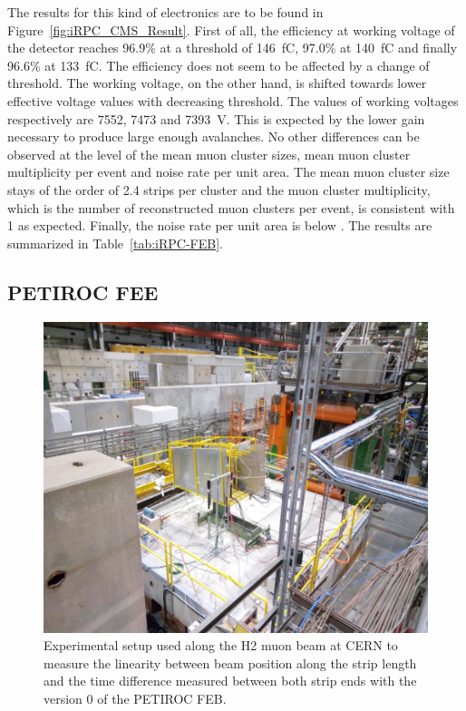     The results for this kind of electronics are to be found in Figure~\ref{fig:iRPC_CMS_Result}. First of all, the efficiency at working voltage of the detector reaches 96.9\% at a threshold of \SI{146}{fC}, 97.0\% at \SI{140}{fC} and finally 96.6\% at \SI{133}{fC}. The efficiency does not seem to be affected by a change of threshold. The working voltage, on the other hand, is shifted towards lower effective voltage values with decreasing threshold. The values of working voltages respectively are 7552, 7473 and \SI{7393}{V}. This is expected by the lower gain necessary to produce large enough avalanches. No other differences can be observed at the level of the mean muon cluster sizes, mean muon cluster multiplicity per event and noise rate per unit area. The mean muon cluster size stays of the order of 2.4 strips per cluster and the muon cluster multiplicity, which is the number of reconstructed muon clusters per event, is consistent with 1 as expected. Finally, the noise rate per unit area is below . The results are summarized in Table~\ref{tab:iRPC-FEB}.
	
		\subsection{PETIROC FEE}
		\label{chapt6:ssec:RPCROCcert}

\begingroup\setlength{\intextsep}{0pt}\setlength{\columnsep}{15pt}
	
	\begin{figure}
		\centering
		\includegraphics[width = 0.9\linewidth]{fig/chapt6/iRPC-RPCROC-H2.png}
		\caption{\label{fig:RPCROCv0_H2} Experimental setup used along the H2 muon beam at CERN to measure the linearity between beam position along the strip length and the time difference measured between both strip ends with the version 0 of the PETIROC FEB.}
    \end{figure}
		
